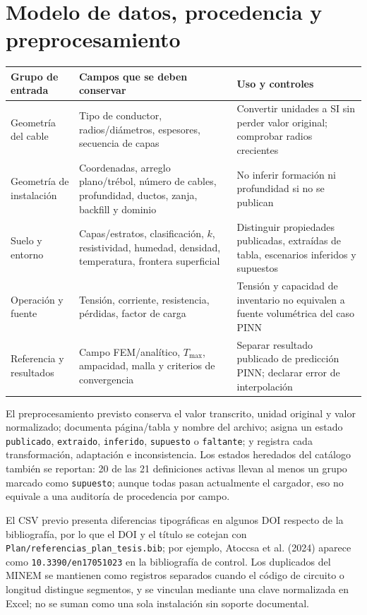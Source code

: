 \documentclass[11pt,a4paper,oneside]{report}
\begin{document}
\chapter*{Modelo de datos, procedencia y preprocesamiento}
\small
\setlength{\tabcolsep}{3pt}
\begin{longtable}{p{2.8cm}p{5.1cm}p{5.8cm}}
\toprule
\textbf{Grupo de entrada} & \textbf{Campos que se deben conservar} & \textbf{Uso y controles} \\
\midrule
Geometr\'ia del cable & Tipo de conductor, radios/di\'ametros, espesores, secuencia de capas & Convertir unidades a SI sin perder valor original; comprobar radios crecientes \\
Geometr\'ia de instalaci\'on & Coordenadas, arreglo plano/tr\'ebol, n\'umero de cables, profundidad, ductos, zanja, backfill y dominio & No inferir formaci\'on ni profundidad si no se publican \\
Suelo y entorno & Capas/estratos, clasificaci\'on, $k$, resistividad, humedad, densidad, temperatura, frontera superficial & Distinguir propiedades publicadas, extra\'idas de tabla, escenarios inferidos y supuestos \\
Operaci\'on y fuente & Tensi\'on, corriente, resistencia, p\'erdidas, factor de carga & Tensi\'on y capacidad de inventario no equivalen a fuente volum\'etrica del caso PINN \\
Referencia y resultados & Campo FEM/anal\'itico, $T_{\max}$, ampacidad, malla y criterios de convergencia & Separar resultado publicado de predicci\'on PINN; declarar error de interpolaci\'on \\
\bottomrule
\end{longtable}

El preprocesamiento previsto conserva el valor transcrito, unidad original y valor normalizado; documenta p\'agina/tabla y nombre del archivo; asigna un estado \texttt{publicado}, \texttt{extraido}, \texttt{inferido}, \texttt{supuesto} o \texttt{faltante}; y registra cada transformaci\'on, adaptaci\'on e inconsistencia. Los estados heredados del cat\'alogo tambi\'en se reportan: 20 de las 21 definiciones activas llevan al menos un grupo marcado como \texttt{supuesto}; aunque todas pasan actualmente el cargador, eso no equivale a una auditor\'ia de procedencia por campo.

El CSV previo presenta diferencias tipogr\'aficas en algunos DOI respecto de la bibliograf\'ia, por lo que el DOI y el t\'itulo se cotejan con \texttt{Plan/referencias\_plan\_tesis.bib}; por ejemplo, Atoccsa et al. (2024) aparece como \texttt{10.3390/en17051023} en la bibliograf\'ia de control. Los duplicados del MINEM se mantienen como registros separados cuando el c\'odigo de circuito o longitud distingue segmentos, y se vinculan mediante una clave normalizada en Excel; no se suman como una sola instalaci\'on sin soporte documental.
\end{document}
